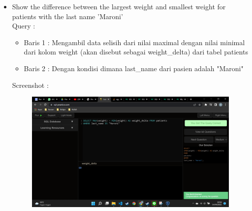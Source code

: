 \documentclass[]{article}
\begin{document}
\begin{itemize}
        \item Show the difference between the largest weight and smallest weight for patients with the last name 'Maroni'
        \\Query :
        
        \begin{itemize}
            \item Baris 1 : Mengambil data selisih dari nilai maximal dengan nilai minimal dari kolom weight (akan disebut sebagai weight\_delta) dari tabel patients
            \item Baris 2 : Dengan kondisi dimana last\_name dari pasien adalah "Maroni"
        \end{itemize}
        \pagebreak
        Screenshot :
        \begin{figure}[h]
            \includegraphics[scale=0.3]{./Screenshot/Medium-16.png}
            \centering
        \end{figure}


\end{itemize}
\end{document}
